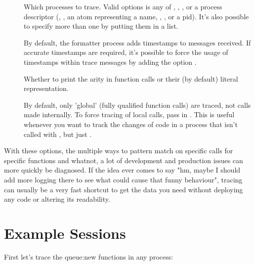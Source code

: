 \documentclass[11pt, oneside]{book}   	%
\begin{document}
\begin{description}
	\item[] \hfill
	
		Which processes to trace. Valid options is any of , , , or a process descriptor (, , an atom representing a name, , , or a pid). It's also possible to specify more than one by putting them in a list.
		
	\item[] \hfill
	
		By default, the formatter process adds timestamps to messages received. If accurate timestamps are required, it's possible to force the usage of timestamps within trace messages by adding the option .
		
	\item[] \hfill
	
		Whether to print the arity in function calls or their (by default) literal representation.
		
 	\item[] \hfill
	
		By default, only 'global' (fully qualified function calls) are traced, not calls made internally. To force tracing of local calls, pass in . This is useful whenever you want to track the changes of code in a process that isn't called with , but just .
\end{description}

With these options, the multiple ways to pattern match on specific calls for specific functions and whatnot, a lot of development and production issues can more quickly be diagnosed. If the idea ever comes to say "hm, maybe I should add more logging there to see what could cause that funny behaviour", tracing can usually be a very fast shortcut to get the data you need without deploying any code or altering its readability.


\section{Example Sessions}

First let's trace the queue:new functions in any process:
\end{document}
